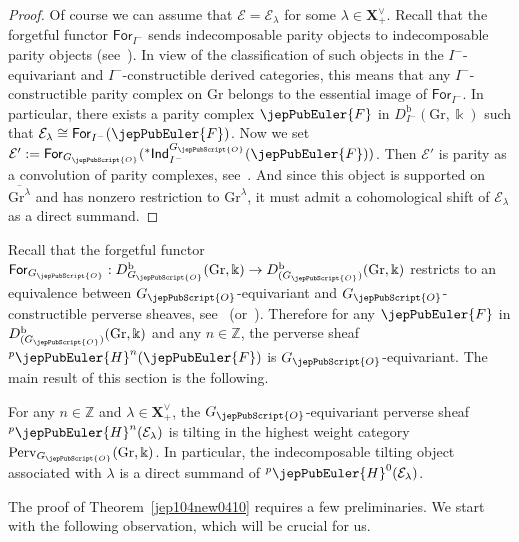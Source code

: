 \begin{proof}
Of course we can assume that $\mathcal E=\mathcal E_{\lambda}$ for some $\lambda\in\boldsymbol{X}^{\vee}_+$.
Recall that the forgetful functor $\mathsf{For}_{I^-}$ sends indecomposable parity objects to indecomposable parity objects (see~\cite[Lem.~2.4]{jep104ref35}).
In view of the classification of such objects in the $I^-$-equivariant and $I^-$-constructible derived categories, this means that any $I^-$-constructible parity complex on $\mathrm{Gr}$ belongs to the essential image of $\mathsf{For}_{I^-}$.
In particular, there exists a parity complex $\jepPubEuler{F}$ in $D^{\mathrm b}_{I^-}(\mathrm{Gr},\Bbbk)$ such that $\mathcal E_{\lambda}\cong\mathsf{For}_{I^-}(\jepPubEuler{F})$.
Now we set $\mathcal E':=\mathsf{For}_{G_{\jepPubScript{O}}}({}^{*}\mathsf{Ind}_{I^-}^{G_{\jepPubScript{O}}}(\jepPubEuler{F}))$.
Then $\mathcal E'$ is parity as a convolution of parity complexes, see~\cite[Th.~4.8]{jep104ref31}.
And since this object is supported on $\overline{\mathrm{Gr}^{\lambda}}$ and has nonzero restriction to $\mathrm{Gr}^{\lambda}$, it must admit a cohomological shift of $\mathcal E_{\lambda}$ as a direct summand.
\end{proof}
Recall that the forgetful functor $\mathsf{For}_{G_{\jepPubScript{O}}}:D^{\mathrm b}_{G_{\jepPubScript{O}}}(\mathrm{Gr},\Bbbk)\to D^{\mathrm b}_{(G_{\jepPubScript{O}})}(\mathrm{Gr},\Bbbk)$ restricts to an equivalence between $G_{\jepPubScript{O}}$-equivariant and $G_{\jepPubScript{O}}$-constructible perverse sheaves, see~\cite[Prop.~2.1]{jep104ref36} (or~\cite[Prop.~1.10.8]{jep104ref11}).
Therefore for any $\jepPubEuler{F}$ in $D^{\mathrm b}_{(G_{\jepPubScript{O}})}(\mathrm{Gr},\Bbbk)$ and any $n\in\mathbb Z$, the perverse sheaf ${}^{p}\jepPubEuler{H}^{n}(\jepPubEuler{F})$ is $G_{\jepPubScript{O}}$-equivariant.
The main result of this section is the following.
\setcounter{thm}{9}
\begin{thm}\label{jep104new0410}
For any $n\in\mathbb Z$ and $\lambda\in\boldsymbol{X}^{\vee}_+$, the $G_{\jepPubScript{O}}$-equivariant perverse sheaf ${}^{p}\jepPubEuler{H}^{n}(\mathcal E_{\lambda})$ is tilting in the highest weight category $\mathrm{Perv}_{G_{\jepPubScript{O}}}(\mathrm{Gr},\Bbbk)$.
In particular, the indecomposable tilting object associated with $\lambda$ is a direct summand of ${}^{p}\jepPubEuler{H}^{0}(\mathcal E_{\lambda})$.
\end{thm}
The proof of Theorem~\ref{jep104new0410} requires a few preliminaries. We start with the following observation, which will be crucial for us.
